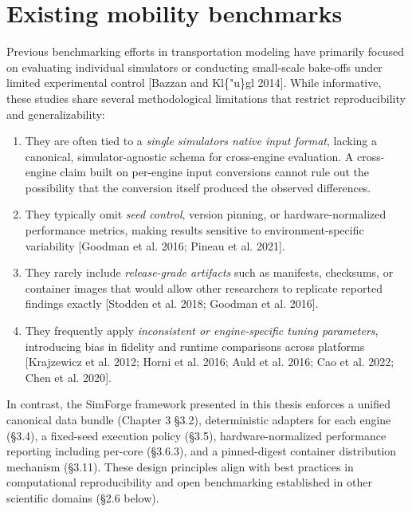 \section{Existing mobility
benchmarks}\label{25-existing-mobility-benchmarks}

Previous benchmarking efforts in transportation modeling have primarily
focused on evaluating individual simulators or conducting small-scale
bake-offs under limited experimental control {[}Bazzan and Kl\{"u\}gl
2014{]}. While informative, these studies share several methodological
limitations that restrict reproducibility and generalizability:

\begin{enumerate}
\def\labelenumi{\arabic{enumi}.}
\item
  They are often tied to a \emph{single simulator\textquotesingle s
  native input format}, lacking a canonical, simulator-agnostic schema
  for cross-engine evaluation. A cross-engine claim built on per-engine
  input conversions cannot rule out the possibility that the conversion
  itself produced the observed differences.
\item
  They typically omit \emph{seed control}, version pinning, or
  hardware-normalized performance metrics, making results sensitive to
  environment-specific variability {[}Goodman et al. 2016; Pineau et al.
  2021{]}.
\item
  They rarely include \emph{release-grade artifacts} such as manifests,
  checksums, or container images that would allow other researchers to
  replicate reported findings exactly {[}Stodden et al. 2018; Goodman et
  al. 2016{]}.
\item
  They frequently apply \emph{inconsistent or engine-specific tuning
  parameters}, introducing bias in fidelity and runtime comparisons
  across platforms {[}Krajzewicz et al. 2012; Horni et al. 2016; Auld et
  al. 2016; Cao et al. 2022; Chen et al. 2020{]}.
\end{enumerate}

In contrast, the SimForge framework presented in this thesis enforces a
unified canonical data bundle (Chapter 3 §3.2), deterministic adapters
for each engine (§3.4), a fixed-seed execution policy (§3.5),
hardware-normalized performance reporting including per-core (§3.6.3),
and a pinned-digest container distribution mechanism (§3.11). These
design principles align with best practices in computational
reproducibility and open benchmarking established in other scientific
domains (§2.6 below).

